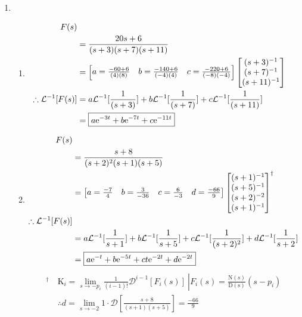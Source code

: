 \documentclass[main.tex]{subfiles}
\begin{document}
\begin{enumerate}
	\item
		\begin{enumerate}
				\item
					\begin{align*}
						F(s) 
						\\&= \frac{20s+6}{(s+3)(s+7)(s+11)}
						\\&= 
								\begin{bmatrix*}
									a = \frac{-60+6}{(4)(8)} & b = \frac{-140+6}{(-4)(4)} & c= \frac{-220+6}{(-8)(-4)}
								\end{bmatrix*}
								\begin{bmatrix*}
									  (s+3)^{-1}
									\\(s+7)^{-1}
									\\(s+11)^{-1}
								\end{bmatrix*}
						\\\therefore \Lapinv{F(s)} 
						  &= a\Lapinv{\frac{1}{(s+3)}} + b\Lapinv{\frac{1}{(s+7)}} + c\Lapinv{\frac{1}{(s+11)}}
						\\&= \boxed{a\e^{-3t} + b\e^{-7t} + c\e^{-11t}}
					\end{align*}
				\item
					\begin{align*}
							F(s) 
						\\&= \frac{s+8}{(s+2)^2(s+1)(s+5)}
						\\&= 
							\begin{bmatrix*}
								a = \frac{-7}{4} & b = \frac{3}{-36} & c = \frac{6}{-3} & d = \frac{-66}{9}
							\end{bmatrix*}
							\begin{bmatrix*}
								  (s+1)^{-1}
								\\(s+5)^{-1}
								\\(s+2)^{-2}
								\\(s+1)^{-1}
							\end{bmatrix*}^{\dagger}
						\\\therefore \Lapinv{F(s)} 
						\\&= a\Lapinv{\frac{1}{s+1}} + b\Lapinv{\frac{1}{s+5}} + c\Lapinv{\frac{1}{(s+2)^2}} + d\Lapinv{\frac{1}{s+2}}
						\\&= \boxed{a\e^{-t} + b\e^{-5t} + ct\e^{-2t} + d\e^{-2t}}
					\end{align*}
					\begin{align*}
						^{\dagger}\ 
							  &\left. \mathrm{K}_i = \lim_{s \to -p_i} \frac{1}{(i-1)!} \mathcal{D}^{i-1}[F_i(s)]\ \right| 
								  F_i(s) = \frac{\mathrm{N}(s)}{\mathrm{D(s)}}(s-p_i)
							\\&\therefore d = \lim_{s \to -2} 1\cdot \mathcal{D}[\frac{s+8}{(s+1)(s+5)}] = \frac{-66}{9}
					\end{align*}
			\end{enumerate}


\end{enumerate}
\end{document}

